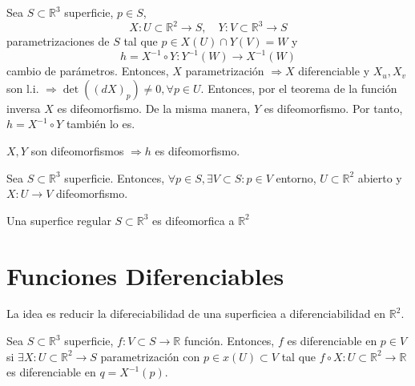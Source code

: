 \begin{dem}
  Sea $S \subset \mathbb{R}^{3}$ superficie, $p \in S$,
  \[
    X : U \subset \mathbb{R}^{2} \to S, \quad Y : V \subset \mathbb{R}^{3} \to S
  \]
  parametrizaciones de $S$ tal que $p \in X(U)\cap Y(V) = W$ y
  \[
    h = X^{-1} \circ Y : Y^{-1}(W) \to X^{-1}(W)
  \]
  cambio de parámetros. Entonces, $X$ parametrización $\Rightarrow X$ diferenciable y $X_{u}, X_{v}$ son l.i. $\Rightarrow \det((d X)_{p}) \neq 0, \forall p \in U$. Entonces, por el teorema de la función inversa $X$ es difeomorfismo. De la misma manera, $Y$ es difeomorfismo. Por tanto, $h = X^{-1} \circ Y$ también lo es.
\end{dem}

\begin{obs}
  $X, Y$ son difeomorfismos $\Rightarrow h$ es difeomorfismo.
\end{obs}

\begin{defn}
  Sea $S \subset \mathbb{R}^{3}$ superficie. Entonces, $ \forall p \in S, \exists V \subset S :  p \in V$ entorno, $U \subset \mathbb{R}^{2}$ abierto y $X : U \to V$ difeomorfismo.
\end{defn}

\begin{obs}
  Una superfice regular $S \subset \mathbb{R}^{3}$ es difeomorfica a $\mathbb{R}^{2}$
\end{obs}

%

\section{Funciones Diferenciables}

\begin{note}
  La idea es reducir la difereciabilidad de una superficiea a diferenciabilidad en $\mathbb{R}^{2}$.
\end{note}

\begin{defn}
  Sea $S \subset \mathbb{R}^{3}$ superficie, $f: V \subset S \to \mathbb{R}$ función. Entonces, $f$ es diferenciable en $p \in V$ si $\exists X: U \subset \mathbb{R}^{2} \to S$ parametrización con $p \in x(U) \subset V$ tal que $f \circ X:  U \subset \mathbb{R}^{2} \to \mathbb{R}$ es diferenciable en $q = X^{-1}(p)$.
\end{defn}

